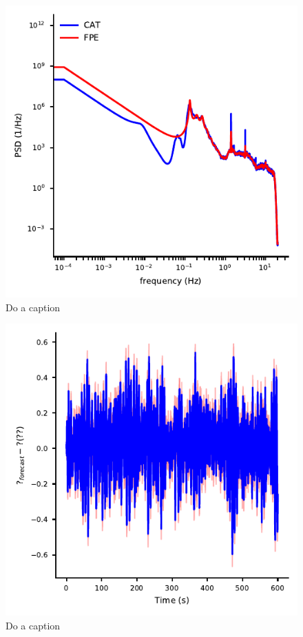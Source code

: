 \documentclass[twocolumn,showpacs,preprintnumbers,nofootinbib,prd,
superscriptaddress,10pt]{revtex4-1}
\begin{document}
\begin{figure}
	\caption{Do a caption}
	\label{fig:seismic_spectrum}
	\includegraphics{Images/seismic_plots/seismic_spectrum.pdf}
\end{figure}

\begin{figure}
	\caption{Do a caption}
	\label{fig:seismic_forecast}
	\includegraphics{Images/seismic_plots/forecast_accuracy.pdf}
\end{figure}
\end{document}
